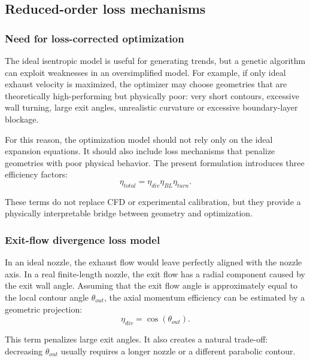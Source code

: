 \documentclass[11pt,a4paper]{article}
\begin{document}
\subsection{Reduced-order loss mechanisms}

\subsubsection{Need for loss-corrected optimization}

The ideal isentropic model is useful for generating trends, but a genetic algorithm can exploit weaknesses in an oversimplified model. For example, if only ideal exhaust velocity is maximized, the optimizer may choose geometries that are theoretically high-performing but physically poor: very short contours, excessive wall turning, large exit angles, unrealistic curvature or excessive boundary-layer blockage.

For this reason, the optimization model should not rely only on the ideal expansion equations. It should also include loss mechanisms that penalize geometries with poor physical behavior. The present formulation introduces three efficiency factors:
\begin{equation}
\eta_{total}=\eta_{div}\eta_{BL}\eta_{turn}.
\label{eq:eta_total_intro}
\end{equation}

These terms do not replace CFD or experimental calibration, but they provide a physically interpretable bridge between geometry and optimization.

\subsubsection{Exit-flow divergence loss model}

In an ideal nozzle, the exhaust flow would leave perfectly aligned with the nozzle axis. In a real finite-length nozzle, the exit flow has a radial component caused by the exit wall angle. Assuming that the exit flow angle is approximately equal to the local contour angle $\theta_{out}$, the axial momentum efficiency can be estimated by a geometric projection:
\begin{equation}
\boxed{\eta_{div}=\cos(\theta_{out})}.
\label{eq:eta_div}
\end{equation}

This term penalizes large exit angles. It also creates a natural trade-off: decreasing $\theta_{out}$ usually requires a longer nozzle or a different parabolic contour.
\end{document}
